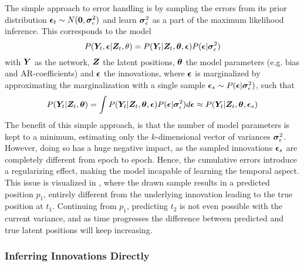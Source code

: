         The simple approach to error handling is by sampling the errors from its prior distribution $\bm{\epsilon}_t \sim N(\bm{0},\bm{\sigma}_\epsilon^2)$ and learn $\bm{\sigma}_\epsilon^2$ as a part of the maximum likelihood inference.
        This corresponds to the model
        \begin{equation}
            P(\bm{Y}_t,\bm{\epsilon}|\bm{Z}_t,\theta) = P(\bm{Y}_t|\bm{Z}_t,\bm{\theta},\bm{\epsilon})P(\bm{\epsilon}|\bm{\sigma}_\epsilon^2)
        \end{equation}
        with $\bm{Y}$ as the network, $\bm{Z}$ the latent positions, $\bm{\theta}$ the model parameters (e.g. bias and AR-coefficients) and $\bm{\epsilon}$ the innovations, where $\bm{\epsilon}$ is marginalized by approximating the marginalization with a single sample $\bm{\epsilon}_s \sim P(\bm{\epsilon}|\bm{\sigma}_\epsilon^2)$, such that
        \begin{equation}
            P(\bm{Y}_t|\bm{Z}_t,\bm{\theta}) = \int P(\bm{Y}_t|\bm{Z}_t,\bm{\theta},\bm{\epsilon}) P(\bm{\epsilon}|\bm{\sigma}_\epsilon^2) d\bm{\epsilon} \approx P(\bm{Y}_t|\bm{Z}_t,\bm{\theta},\bm{\epsilon}_s)
        \end{equation}
        The benefit of this simple approach, is that the number of model parameters is kept to a minimum, estimating only the $k$-dimensional vector of variances $\bm{\sigma}_\epsilon^2$. However, doing so has a huge negative impact, as the sampled innovations $\bm{\epsilon}_s$ are completely different from epoch to epoch. Hence, the cumulative errors introduce a regularizing effect, making the model incapable of learning the temporal aspect. This issue is visualized in , where the drawn sample results in a predicted position $p_1$, entirely different from the underlying innovation leading to the true position at $t_1$. 
        Continuing from $p_1$, predicting $t_2$ is not even possible with the current variance, and as time progresses the difference between predicted and true latent positions will keep increasing.
    
    \subsubsection{Inferring Innovations Directly}

